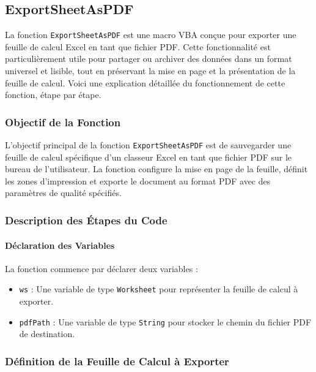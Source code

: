 \documentclass[a4paper, oneside, 12pt, final]{extreport}
\begin{document}
\subsection{ExportSheetAsPDF}

La fonction \texttt{ExportSheetAsPDF} est une macro VBA conçue pour exporter une feuille de calcul Excel en tant que fichier PDF. Cette fonctionnalité est particulièrement utile pour partager ou archiver des données dans un format universel et lisible, tout en préservant la mise en page et la présentation de la feuille de calcul. Voici une explication détaillée du fonctionnement de cette fonction, étape par étape.

\subsubsection{Objectif de la Fonction}

L'objectif principal de la fonction \texttt{ExportSheetAsPDF} est de sauvegarder une feuille de calcul spécifique d'un classeur Excel en tant que fichier PDF sur le bureau de l'utilisateur. La fonction configure la mise en page de la feuille, définit les zones d'impression et exporte le document au format PDF avec des paramètres de qualité spécifiés.

\subsubsection{Description des Étapes du Code}

\paragraph{Déclaration des Variables}

La fonction commence par déclarer deux variables :

\begin{itemize}
    \item \texttt{ws} : Une variable de type \texttt{Worksheet} pour représenter la feuille de calcul à exporter.
    \item \texttt{pdfPath} : Une variable de type \texttt{String} pour stocker le chemin du fichier PDF de destination.
\end{itemize}

\subsubsection{Définition de la Feuille de Calcul à Exporter}
\end{document}

